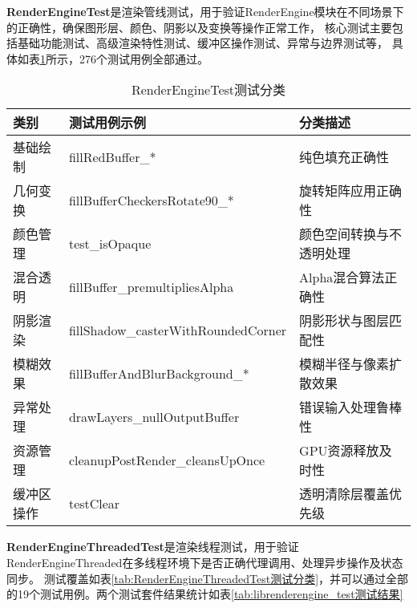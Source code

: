 \textbf{RenderEngineTest}是渲染管线测试，用于验证RenderEngine模块在不同场景下的正确性，确保图形层、颜色、阴影以及变换等操作正常工作，
核心测试主要包括基础功能测试、高级渲染特性测试、缓冲区操作测试、异常与边界测试等，
具体如表\ref{tab:RenderEngineTest测试分类}所示，276个测试用例全部通过。
    \begin{table}[H]
        \centering
        \caption{RenderEngineTest测试分类}
        \label{tab:RenderEngineTest测试分类}
        \begin{tabular}{lll}
          \toprule
          类别 & 测试用例示例 & 分类描述 \\
          \midrule
            基础绘制 & fillRedBuffer\_* & 纯色填充正确性 \\
            几何变换 & fillBufferCheckersRotate90\_* & 旋转矩阵应用正确性 \\
            颜色管理 & test\_isOpaque & 颜色空间转换与不透明处理 \\
            混合透明 & fillBuffer\_premultipliesAlpha & Alpha混合算法正确性 \\
            阴影渲染 & fillShadow\_casterWithRoundedCorner & 阴影形状与图层匹配性 \\
            模糊效果 & fillBufferAndBlurBackground\_* & 模糊半径与像素扩散效果 \\
            异常处理 & drawLayers\_nullOutputBuffer & 错误输入处理鲁棒性 \\
            资源管理 & cleanupPostRender\_cleansUpOnce & GPU资源释放及时性 \\
            缓冲区操作 & testClear & 透明清除层覆盖优先级 \\
          \bottomrule
        \end{tabular}
        \note{}
    \end{table}

\textbf{RenderEngineThreadedTest}是渲染线程测试，用于验证RenderEngineThreaded在多线程环境下是否正确代理调用、处理异步操作及状态同步。
测试覆盖如表\ref{tab:RenderEngineThreadedTest测试分类}，并可以通过全部的19个测试用例。两个测试套件结果统计如表\ref{tab:librenderengine_test测试结果}

